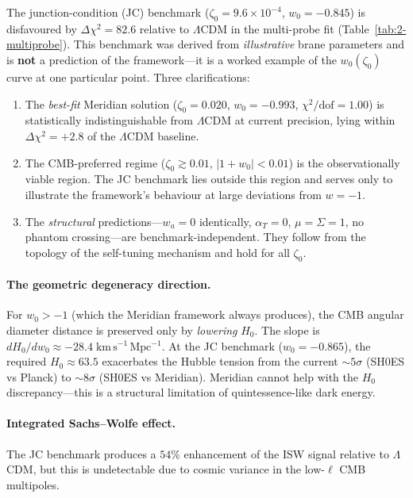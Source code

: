 \begin{remark}\label{rem:2-benchmark-status}
The junction-condition (JC) benchmark ($\zeta_0 = 9.6 \times 10^{-4}$, $w_0 = -0.845$) is
disfavoured by $\Delta\chi^2 = 82.6$ relative to $\Lambda$CDM in the multi-probe fit
(Table~\ref{tab:2-multiprobe}).  This benchmark was derived from \emph{illustrative} brane
parameters and is \textbf{not} a prediction of the framework---it is a worked example of
the $w_0(\zeta_0)$ curve at one particular point.  Three clarifications:
\begin{enumerate}
\item The \emph{best-fit} Meridian solution ($\zeta_0 = 0.020$, $w_0 = -0.993$,
  $\chi^2/\mathrm{dof} = 1.00$) is statistically indistinguishable from $\Lambda$CDM at
  current precision, lying within $\Delta\chi^2 = +2.8$ of the $\Lambda$CDM baseline.
\item The CMB-preferred regime ($\zeta_0 \gtrsim 0.01$, $|1+w_0| < 0.01$) is the
  observationally viable region.  The JC benchmark lies outside this region and serves only
  to illustrate the framework's behaviour at large deviations from $w = -1$.
\item The \emph{structural} predictions---$w_a = 0$ identically, $\alpha_T = 0$,
  $\mu = \Sigma = 1$, no phantom crossing---are benchmark-independent.  They follow from
  the topology of the self-tuning mechanism and hold for all $\zeta_0$.
\end{enumerate}
\end{remark}

\paragraph{The geometric degeneracy direction.} For $w_0 > -1$ (which the Meridian framework always produces), the CMB angular diameter distance is preserved only by \emph{lowering} $H_0$. The slope is $dH_0/dw_0 \approx -28.4\;\mathrm{km\,s^{-1}\,Mpc^{-1}}$. At the JC benchmark ($w_0 = -0.865$), the required $H_0 \approx 63.5$ exacerbates the Hubble tension from the current $\sim\!5\sigma$ (SH0ES vs Planck) to $\sim\!8\sigma$ (SH0ES vs Meridian). Meridian cannot help with the $H_0$ discrepancy---this is a structural limitation of quintessence-like dark energy.

\paragraph{Integrated Sachs--Wolfe effect.} The JC benchmark produces a $54\%$ enhancement of the ISW signal relative to $\Lambda$CDM, but this is undetectable due to cosmic variance in the low-$\ell$ CMB multipoles.

